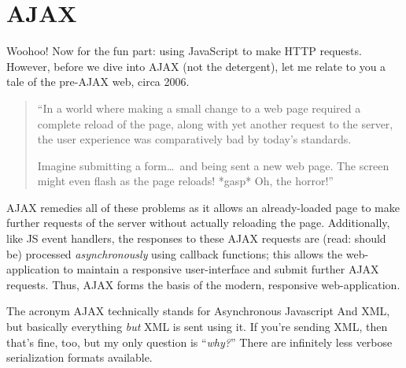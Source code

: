 \documentclass[12pt]{article}
\begin{document}
\section{AJAX}
Woohoo! Now for the fun part: using JavaScript to make HTTP requests. However, before we dive into AJAX (not the detergent), let me relate to you a tale of the pre-AJAX web, circa 2006.
\begin{quote}
``In a world where making a small change to a web page required a complete reload of the page, along with yet another request to the server, the user experience was comparatively bad by today's standards.
\par
Imagine submitting a form\ldots\ and being sent a new web page. The screen might even flash as the page reloads! *gasp* Oh, the horror!''
\end{quote}
AJAX remedies all of these problems as it allows an already-loaded page to make further requests of the server without actually reloading the page. Additionally, like JS event handlers, the responses to these AJAX requests are (read: should be) processed \emph{asynchronously} using callback functions; this allows the web-application to maintain a responsive user-interface and submit further AJAX requests. Thus, AJAX forms the basis of the modern, responsive web-application.
\par
The acronym AJAX technically stands for Asynchronous Javascript And XML, but basically everything \emph{but} XML is sent using it. If you're sending XML, then that's fine, too, but my only question is ``\emph{why?}'' There are infinitely less verbose serialization formats available.
\end{document}
